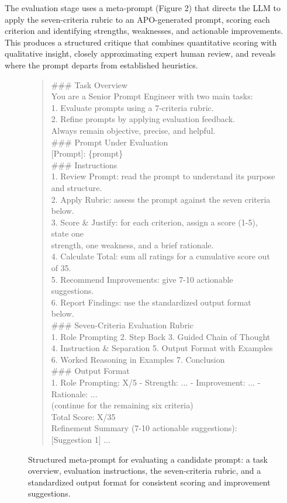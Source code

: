 \documentclass[a4paper,fleqn]{cas-sc}
\begin{document}
The evaluation stage uses a meta-prompt (Figure 2) that directs the LLM to apply the seven-criteria rubric to an APO-generated prompt, scoring each criterion and identifying strengths, weaknesses, and actionable improvements. This produces a structured critique that combines quantitative scoring with qualitative insight, closely approximating expert human review, and reveals where the prompt departs from established heuristics.

\begin{figure}[htbp]
\centering
\begin{quote}\ttfamily\small
\#\#\# Task Overview\\{}
You are a Senior Prompt Engineer with two main tasks:\\{}
1. Evaluate prompts using a 7-criteria rubric.\\{}
2. Refine prompts by applying evaluation feedback.\\{}
Always remain objective, precise, and helpful.\\{}
\#\#\# Prompt Under Evaluation\\{}
[Prompt]: \{prompt\}\\{}
\#\#\# Instructions\\{}
1. Review Prompt: read the prompt to understand its purpose and structure.\\{}
2. Apply Rubric: assess the prompt against the seven criteria below.\\{}
3. Score \& Justify: for each criterion, assign a score (1-5), state one\\{}
   strength, one weakness, and a brief rationale.\\{}
4. Calculate Total: sum all ratings for a cumulative score out of 35.\\{}
5. Recommend Improvements: give 7-10 actionable suggestions.\\{}
6. Report Findings: use the standardized output format below.\\{}
\#\#\# Seven-Criteria Evaluation Rubric\\{}
1. Role Prompting  2. Step Back  3. Guided Chain of Thought\\{}
4. Instruction \& Separation  5. Output Format with Examples\\{}
6. Worked Reasoning in Examples  7. Conclusion\\{}
\#\#\# Output Format\\{}
1. Role Prompting: X/5 - Strength: ... - Improvement: ... - Rationale: ...\\{}
(continue for the remaining six criteria)\\{}
Total Score: X/35\\{}
Refinement Summary (7-10 actionable suggestions): [Suggestion 1] ...\\{}
\end{quote}
\caption{Structured meta-prompt for evaluating a candidate prompt: a task overview, evaluation instructions, the seven-criteria rubric, and a standardized output format for consistent scoring and improvement suggestions.}
\end{figure}
\end{document}
